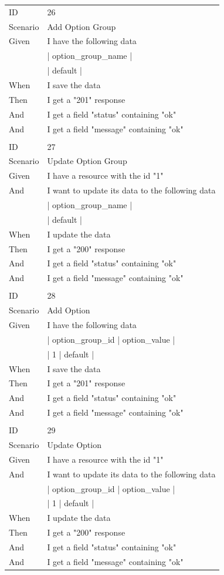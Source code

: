 \documentclass{report}
\begin{document}
\begin{tabular}{ l l }
ID 			& 26\\
Scenario		& Add Option Group \\
Given 		& I have the following data \\
	      	& | option\_group\_name | \\
      		& | default      | \\ 
When 		& I save the data \\
Then 		& I get a "201" response \\
And 			& I get a field "status" containing "ok" \\
And 			& I get a field "message" containing "ok" \\ \\
ID 			& 27\\
Scenario		& Update Option Group \\
Given 		& I have a resource with the id "1" \\
And 			& I want to update its data to the following data \\
      		& | option\_group\_name | \\
	      	& | default      | \\
When 		& I update the data \\
Then 		& I get a "200" response \\
And 			& I get a field "status" containing "ok" \\
And 			& I get a field "message" containing "ok" \\ \\
ID 			& 28\\
Scenario		& Add Option \\
Given 		& I have the following data \\
	      	& | option\_group\_id | option\_value | \\
      		& | 1               | default      | \\
When 		& I save the data \\
Then 		& I get a "201" response \\
And 			& I get a field "status" containing "ok" \\
And 			& I get a field "message" containing "ok" \\ \\
ID 			& 29\\
Scenario		& Update Option \\
Given 		& I have a resource with the id "1" \\
And 			& I want to update its data to the following data \\
      		& | option\_group\_id | option\_value | \\
      		& | 1               | default      | \\
When 		& I update the data \\
Then 		& I get a "200" response \\
And 			& I get a field "status" containing "ok" \\
And 			& I get a field "message" containing "ok" 
\end{tabular}
\newpage
\end{document}
